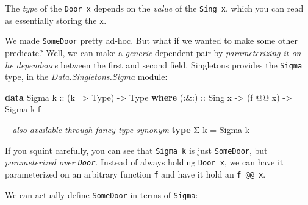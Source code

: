 \documentclass[]{article}
\newenvironment{Shaded}{}{}
\newcommand{\CommentTok}[1]{\textcolor[rgb]{0.38,0.63,0.69}{\textit{#1}}}
\newcommand{\DataTypeTok}[1]{\textcolor[rgb]{0.56,0.13,0.00}{#1}}
\newcommand{\FunctionTok}[1]{\textcolor[rgb]{0.02,0.16,0.49}{#1}}
\newcommand{\KeywordTok}[1]{\textcolor[rgb]{0.00,0.44,0.13}{\textbf{#1}}}
\newcommand{\NormalTok}[1]{#1}
\newcommand{\OtherTok}[1]{\textcolor[rgb]{0.00,0.44,0.13}{#1}}
\begin{document}
The \emph{type} of the \texttt{Door\ x} depends on the \emph{value} of the
\texttt{Sing\ x}, which you can read as essentially storing the \texttt{x}.

We made \texttt{SomeDoor} pretty ad-hoc. But what if we wanted to make some
other predicate? Well, we can make a \emph{generic} dependent pair by
\emph{parameterizing it on he dependence} between the first and second field.
Singletons provides the \texttt{Sigma} type, in the \emph{Data.Singletons.Sigma}
module:

\begin{Shaded}
\begin{Highlighting}[]
\KeywordTok{data} \DataTypeTok{Sigma}\OtherTok{ k ::}\NormalTok{ (k }\FunctionTok{~>} \DataTypeTok{Type}\NormalTok{) }\OtherTok{->} \DataTypeTok{Type} \KeywordTok{where}
\OtherTok{    (:&:) ::} \DataTypeTok{Sing}\NormalTok{ x }\OtherTok{->}\NormalTok{ (f }\FunctionTok{@@}\NormalTok{ x) }\OtherTok{->} \DataTypeTok{Sigma}\NormalTok{ k f}

\CommentTok{-- also available through fancy type synonym}
\KeywordTok{type}\NormalTok{ Σ k }\FunctionTok{=} \DataTypeTok{Sigma}\NormalTok{ k}
\end{Highlighting}
\end{Shaded}

If you squint carefully, you can see that \texttt{Sigma\ k} is just
\texttt{SomeDoor}, but \emph{parameterized over \texttt{Door}}. Instead of
always holding \texttt{Door\ x}, we can have it parameterized on an arbitrary
function \texttt{f} and have it hold an \texttt{f\ @@\ x}.

We can actually define \texttt{SomeDoor} in terms of \texttt{Sigma}:

\begin{Shaded}
\end{Shaded}
\end{document}
